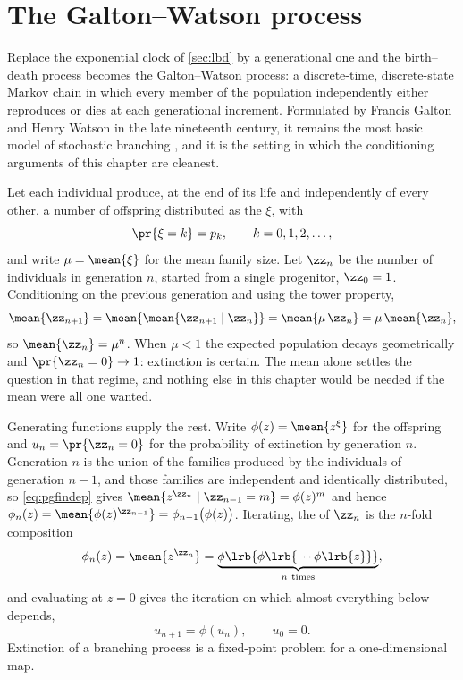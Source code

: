 \section{The Galton--Watson process}
\label{sec:gw}

Replace the exponential clock of \cref{sec:lbd} by a generational one and the
birth--death process becomes the Galton--Watson process: a discrete-time, discrete-state
Markov chain in which every member of the population independently either reproduces or
dies at each generational increment. Formulated by Francis Galton and Henry Watson in
the late nineteenth century, it remains the most basic model of stochastic branching
\cite{Athreya1972,Harris1963}, and it is the setting in which the conditioning arguments
of this chapter are cleanest.

Let each individual produce, at the end of its life and independently of every other, a
number of offspring distributed as the \rv{} $\xi$, with
\begin{equation*}
\pr{\xi = k} = p_k,\qquad k=0,1,2,\dots,
\end{equation*}
and write $\mu = \mean{\xi}$ for the mean family size. Let $\zz_n$ be the number of
individuals in generation $n$, started from a single progenitor, $\zz_0=1$. Conditioning
on the previous generation and using the tower property,
\begin{equation*}
\mean{\zz_{n+1}} = \mean{\mean{\zz_{n+1}\mid\zz_n}} = \mean{\mu\,\zz_n} = \mu\,\mean{\zz_n},
\end{equation*}
so $\mean{\zz_n} = \mu^n$. When $\mu<1$ the expected population decays geometrically and
$\pr{\zz_n=0}\to1$: extinction is certain. The mean alone settles the question in that
regime, and nothing else in this chapter would be needed if the mean were all one wanted.

Generating functions supply the rest. Write $\phi(z) = \mean{z^{\xi}}$ for the offspring
\pgf{} and $u_n = \pr{\zz_n=0}$ for the probability of extinction by generation $n$.
Generation $n$ is the union of the families produced by the individuals of generation
$n-1$, and those families are independent and identically distributed, so
\cref{eq:pgfindep} gives $\mean{z^{\zz_n}\mid\zz_{n-1}=m} = \phi(z)^m$ and hence
$\phi_n(z) = \mean{\phi(z)^{\zz_{n-1}}} = \phi_{n-1}\bigl(\phi(z)\bigr)$. Iterating, the
\pgf{} of $\zz_n$ is the $n$-fold composition
\begin{equation}
\label{eq:phicomp}
\phi_n(z) = \mean{z^{\zz_n}}
= \underset{n\ \text{times}}{\underbrace{\phi\lrb{\phi\lrb{\cdots\phi\lrb{z}}}}},
\end{equation}
and evaluating at $z=0$ gives the iteration on which almost everything below depends,
\begin{equation}
\label{eq:iterPGF}
u_{n+1} = \phi(u_n),\qquad u_0=0 .
\end{equation}
Extinction of a branching process is a fixed-point problem for a one-dimensional map.

